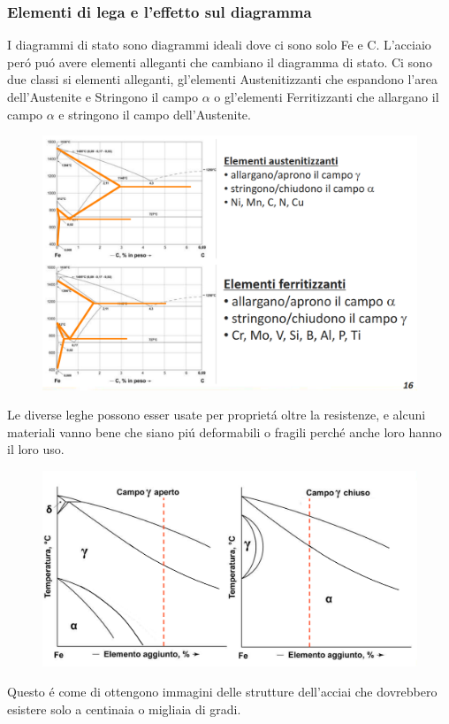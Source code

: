 \documentclass{article}
\begin{document}
{            \subsubsection{Elementi di lega e l'effetto sul diagramma}
                I diagrammi di stato sono diagrammi ideali dove ci sono solo Fe e C. L'acciaio per\'o pu\'o avere elementi alleganti che cambiano il diagramma di stato. Ci sono due classi si elementi alleganti, gl'elementi Austenitizzanti che espandono l'area dell'Austenite e Stringono il campo $\alpha$ o gl'elementi Ferritizzanti che allargano il campo $\alpha$ e stringono il campo dell'Austenite.\\
            \newpage
                \begin{figure}[h!]
                    \centering
                    \includegraphics[width=.8\linewidth]{L14 - Diagramma elementi austenitizzanti e ferritizzanti.png}
                \end{figure}
                Le diverse leghe possono esser usate per propriet\'a oltre la resistenze, e alcuni materiali vanno bene che siano pi\'u deformabili o fragili perch\'e anche loro hanno il loro uso.\\
                \begin{figure}[h!]
                    \centering
                    \includegraphics[width=.8\linewidth]{L14 - Diagramma Austenitizzato e Ferritizzato con + 10pc.png}
                \end{figure}
                Questo \'e come di ottengono immagini delle strutture dell'acciai che dovrebbero esistere solo a centinaia o migliaia di gradi.\\
        \newpage
}
\end{document}
